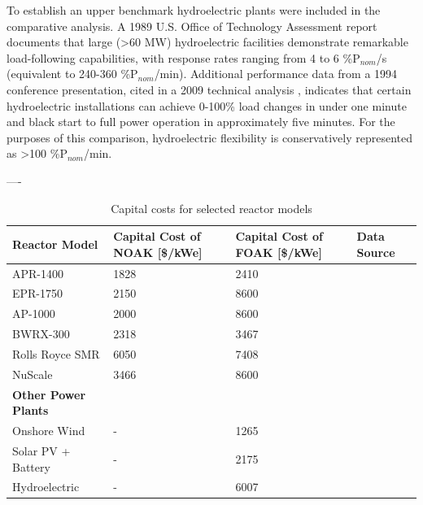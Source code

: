 To establish an upper benchmark hydroelectric plants were included in the comparative analysis. A 1989 U.S. Office of Technology Assessment report \cite{OTA_Electric_Power_Wheeling_1989} documents that large (>60 MW) hydroelectric facilities demonstrate remarkable load-following capabilities, with response rates ranging from 4 to 6 \%P$_{nom}$/s (equivalent to 240-360 \%P$_{nom}$/min). Additional performance data from a 1994 conference presentation, cited in a 2009 technical analysis \cite{osti_219975, MWH_Pumped_Storage_Wind_2009}, indicates that certain hydroelectric installations can achieve 0-100\% load changes in under one minute and black start to full power operation in approximately five minutes. For the purposes of this comparison, hydroelectric flexibility is conservatively represented as >100 \%P$_{nom}$/min.

----


\begin{table}[!hb]
    \centering
    \begin{tabularx}{\textwidth}{l X X X}
        \toprule
        \textbf{Reactor Model} & \textbf{Capital Cost of NOAK [\$/kWe]} & \textbf{Capital Cost of FOAK [\$/kWe]} & Data Source \\
        \midrule
        APR-1400         & 1828 & 2410 & \cite{STEIGERWALD2023128204, NEA2020} \\
        EPR-1750        & 2150 & 8600 & \cite{STEIGERWALD2023128204, NEA2020} \\
        AP-1000          & 2000 & 8600 & \cite{STEIGERWALD2023128204, NEA2020} \\
        BWRX-300        & 2318 & 3467 & \cite{ReutersEvents2018} \\
        Rolls Royce SMR & 6050 & 7408 & \cite{PowerTechnology2022} \\
        NuScale         & 3466 & 8600 & \cite{STEIGERWALD2023128204, NEA2020} \\
        \textbf{Other Power Plants} & & & \\
        Onshore Wind   & - & 1265 & \cite{EIA_Capital_Costs_AEO2024} \\
        Solar PV + Battery & - & 2175 & \cite{EIA_Capital_Costs_AEO2024} \\
        Hydroelectric  & - & 6007 & \cite{EIA_Capital_Costs_AEO2024} \\
        \bottomrule
    \end{tabularx}
    \caption{Capital costs for selected reactor models}
    \label{tab:capital-costs}
\end{table}


